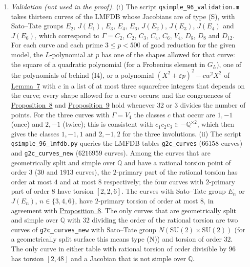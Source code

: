 \documentclass[11pt]{article}
\newcommand{\Q}{\mathbb Q}
\begin{document}
\begin{enumerate}
\item\label{rem-val} \emph{Validation (not used in the proof).} (i) The script
\texttt{qsimple\_96\_validation.m} takes thirteen curves of the LMFDB \cite{LMFDB} whose Jacobians are of type
(S), with Sato--Tate groups \(E_2\), \(J(E_1)\), \(E_3\), \(E_4\), \(E_6\), \(J(E_2)\), \(J(E_3)\), \(J(E_4)\) and
\(J(E_6)\), which correspond to \(\Gamma=C_2\), \(C_2\), \(C_3\), \(C_4\), \(C_6\), \(V_4\), \(D_6\), \(D_8\) and
\(D_{12}\). For each curve and each prime \(3\le p<500\) of good reduction for the given model, the
\(L\)-polynomial at \(p\) has one of the shapes allowed for that curve: the square of a quadratic polynomial (for a
Frobenius element in \(G_L\)), one of the polynomials of \cite[Lemma~2]{P612} behind (I4), or a polynomial
\((X^2+\varepsilon p)^2-cw^2X^2\) of \hyperref[lemma-inv]{Lemma~7} with \(c\) in a list of at most three squarefree integers
that depends on the curve; every shape allowed for a curve occurs; and the congruences of
\hyperref[prop-rot]{Proposition~8} and \hyperref[prop-v4]{Proposition~9} hold whenever \(32\) or \(3\) divides
the number of points. For the three curves with \(\Gamma=V_4\) the classes \(c\) that occur are \(1,-1\) (once)
and \(2,-1\) (twice); this is consistent with \(c_1c_2c_3\in-\Q^{\times2}\), which then gives the classes
\(1,-1,1\) and \(2,-1,2\) for the three involutions. (ii) The script
\texttt{qsimple\_96\_lmfdb.py} queries the LMFDB tables \texttt{g2c\_curves} (\(66158\) curves) and
\texttt{g2c\_curves\_new} (\(6216959\) curves). Among the curves that are geometrically split and simple over
\(\Q\) and have a rational torsion point of order \(3\) (\(30\) and \(1913\) curves), the \(2\)-primary part of
the rational torsion has order at most \(4\) and at most \(8\) respectively; the four curves with \(2\)-primary
part of order \(8\) have torsion \([2,2,6]\). The curves with Sato--Tate group \(E_n\) or \(J(E_n)\),
\(n\in\{3,4,6\}\), have \(2\)-primary torsion of order at most \(8\), in agreement with
\hyperref[prop-rot]{Proposition~8}. The only curves that are geometrically split and simple over \(\Q\) with
\(32\) dividing the order of the rational torsion are two curves of \texttt{g2c\_curves\_new} with Sato--Tate
group \(N(\mathrm{SU}(2)\times\mathrm{SU}(2))\) (for a geometrically split surface this means type (N)) and torsion of order \(32\). The only curve in
either table with rational torsion of order divisible by \(96\) has torsion \([2,48]\) and a Jacobian that is not
simple over \(\Q\).
\end{enumerate}
\end{document}
